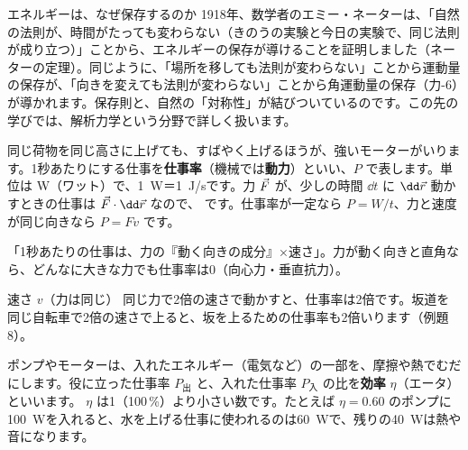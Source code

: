 \begin{phsaki}{エネルギーは、なぜ保存するのか}
1918年、数学者のエミー・ネーターは、「自然の法則が、時間がたっても変わらない（きのうの実験と今日の実験で、同じ法則が成り立つ）」ことから、エネルギーの保存が導けることを証明しました（ネーターの定理）。同じように、「場所を移しても法則が変わらない」ことから運動量の保存が、「向きを変えても法則が変わらない」ことから角運動量の保存（力-6）が導かれます。保存則と、自然の「対称性」が結びついているのです。この先の学びでは、解析力学という分野で詳しく扱います。
\end{phsaki}

\label{ph:力-4:sec8}
同じ荷物を同じ高さに上げても、すばやく上げるほうが、強いモーターがいります。1秒あたりにする仕事を\textbf{仕事率}（機械では\textbf{動力}）といい、$P$ で表します。単位は W（ワット）で、\qty{1}{W}＝\qty{1}{J/s}です。力 $\vec{F}$ が、少しの時間 $\dd t$ に $\dd\pxev r$ 動かすときの仕事は $\pxev F\cdot\dd\pxev r$ なので、
\label{ph:力-4:power}です。仕事率が一定なら $P=W/t$、力と速度が同じ向きなら $P=Fv$ です。

\begin{phyomi}[$P=\pxev F\cdot\pxev v$]
「1秒あたりの仕事は、力の『動く向きの成分』×速さ」。力が動く向きと直角なら、どんなに大きな力でも仕事率は0（向心力・垂直抗力）。
\end{phyomi}

\begin{phbaisuru}{速さ $v$（力は同じ）}
同じ力で2倍の速さで動かすと、仕事率は2倍です。坂道を同じ自転車で2倍の速さで上ると、坂を上るための仕事率も2倍いります（例題8）。
\end{phbaisuru}

\label{ph:力-4:kouritsu}ポンプやモーターは、入れたエネルギー（電気など）の一部を、摩擦や熱でむだにします。役に立った仕事率 $P_{\text{出}}$ と、入れた仕事率 $P_{\text{入}}$ の比を\textbf{効率} $\eta$（エータ）といいます。
$\eta$ は1（100\,\%）より小さい数です。たとえば $\eta=0.60$ のポンプに\qty{100}{W}を入れると、水を上げる仕事に使われるのは\qty{60}{W}で、残りの\qty{40}{W}は熱や音になります。

